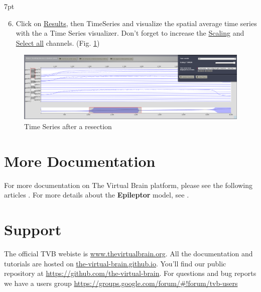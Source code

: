 \documentclass{tufte-handout}
\newenvironment{simulation}{%
  \def\FrameCommand{%
    \hspace{1pt}%
    {\color{ForestGreen}\vrule width 2pt}%
    {\color{simulationshade}\vrule width 4pt}%
    \colorbox{simulationshade}%
  }%
  \MakeFramed{\advance\hsize-\width\FrameRestore}%
  \noindent\hspace{-4.55pt}%
  \begin{adjustwidth}{}{7pt}%
  \vspace{2pt}\vspace{2pt}%
}
{%
  \vspace{2pt}\end{adjustwidth}\endMakeFramed%
}
\begin{document}
\begin{simulation}
  \begin{enumerate}
    \setcounter{enumi}{5}
  \item Click on \underline{Results}, then TimeSeries and visualize the spatial average time series with the a Time Series visualizer.
  Don't forget to increase the \underline{Scaling} and \underline{Select all} channels. (Fig. \ref{fig:ts_resec})
  \end{enumerate}
\end{simulation}

\begin{figure}[h]
  \includegraphics[width=\linewidth]{Handout_UI_ModellingAnEpilepticPatient_TimeSeriesResection}%
  \caption{Time Series after a resection}%
  \label{fig:ts_resec}%
\end{figure}


\section{More Documentation}\label{sec:more-doc}
For more documentation on The Virtual Brain platform, please see the following articles \citep{Sanz-Leon_2013, Woodman_2014}. For more details about the \textbf{Epileptor} model, see  \citep{Jirsa_2014}.


\section{Support}\label{sec:support}

The official TVB webiste is \url{www.thevirtualbrain.org}.  
All the documentation and tutorials are hosted on \url{the-virtual-brain.github.io}.
You'll find our public  repository at \url{https://github.com/the-virtual-brain}. For questions and bug reports we have a users group \url{https://groups.google.com/forum/#!forum/tvb-users}



\end{document}
